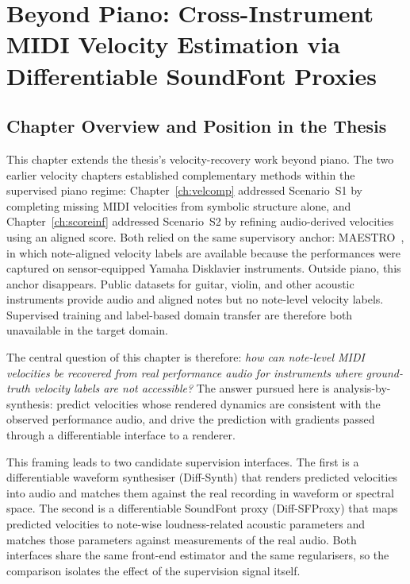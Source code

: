 \chapter{Beyond Piano: Cross-Instrument MIDI Velocity Estimation via Differentiable SoundFont Proxies}
\label{ch:beyondpiano}

\section{Chapter Overview and Position in the Thesis}
\label{sec:bp:overview}

This chapter extends the thesis's velocity-recovery work beyond piano. The two earlier velocity chapters established complementary methods within the supervised piano regime: Chapter~\ref{ch:velcomp} addressed Scenario~S1 by completing missing MIDI velocities from symbolic structure alone, and Chapter~\ref{ch:scoreinf} addressed Scenario~S2 by refining audio-derived velocities using an aligned score. Both relied on the same supervisory anchor: MAESTRO~\cite{hawthorne2019maestro}, in which note-aligned velocity labels are available because the performances were captured on sensor-equipped Yamaha Disklavier instruments. Outside piano, this anchor disappears. Public datasets for guitar, violin, and other acoustic instruments \cite{tamer2023violin, riley2024gaps, riley2024high} provide audio and aligned notes but no note-level velocity labels. Supervised training and label-based domain transfer are therefore both unavailable in the target domain.

The central question of this chapter is therefore: \emph{how can note-level MIDI velocities be recovered from real performance audio for instruments where ground-truth velocity labels are not accessible?} The answer pursued here is analysis-by-synthesis: predict velocities whose rendered dynamics are consistent with the observed performance audio, and drive the prediction with gradients passed through a differentiable interface to a renderer.

This framing leads to two candidate supervision interfaces. The first is a differentiable waveform synthesiser (Diff-Synth) that renders predicted velocities into audio and matches them against the real recording in waveform or spectral space. The second is a differentiable SoundFont proxy (Diff-SFProxy) that maps predicted velocities to note-wise loudness-related acoustic parameters and matches those parameters against measurements of the real audio. Both interfaces share the same front-end estimator and the same regularisers, so the comparison isolates the effect of the supervision signal itself.

